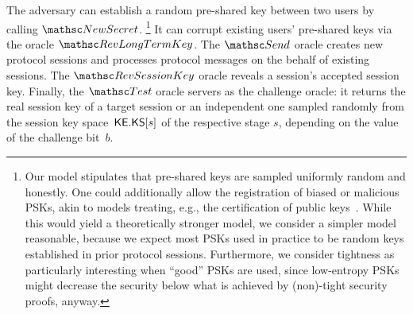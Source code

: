 The adversary can establish a random pre-shared key between two users by calling $\NewSecret$.%
\footnote{%
Our model stipulates that pre-shared keys are sampled uniformly random and honestly.
One could additionally allow the registration of biased or malicious PSKs, akin to models treating, e.g., the certification of public keys~\cite{ESORICS:BCFPPS13}.
While this would yield a theoretically stronger model, we consider a simpler model reasonable, because we expect most PSKs used in practice to be random keys established in prior protocol sessions.
Furthermore, we consider tightness as particularly interesting when ``good'' PSKs are used, since low-entropy PSKs might decrease the security below what is achieved by (non)-tight security proofs, anyway.
}
It can corrupt existing users' pre-shared keys via the oracle $\RevLongTermKey$.
The $\Send$ oracle creates new protocol sessions and processes protocol messages on the behalf of existing sessions.
The $\RevSessionKey$ oracle reveals a session's accepted session key.
Finally, the $\Test$ oracle servers as the challenge oracle:
it returns the real session key of a target session or an independent one sampled randomly from the session key space~$\mathsf{KE}.\mathsf{KS}[s]$ of the respective stage $s$, depending on the value of the challenge bit~$b$.
	
	

